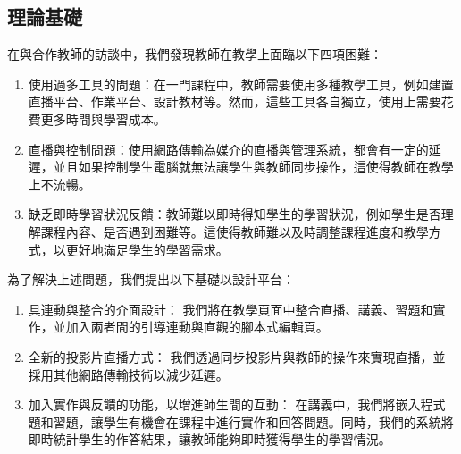 \documentclass[12pt]{article}
\begin{document}
\subsection{理論基礎}
在與合作教師的訪談中，我們發現教師在教學上面臨以下四項困難：
\begin{enumerate}[label=(\arabic*)]
  \item 使用過多工具的問題：在一門課程中，教師需要使用多種教學工具，例如建置直播平台、作業平台、設計教材等。然而，這些工具各自獨立，使用上需要花費更多時間與學習成本。
  \item 直播與控制問題：使用網路傳輸為媒介的直播與管理系統，都會有一定的延遲，並且如果控制學生電腦就無法讓學生與教師同步操作，這使得教師在教學上不流暢。
  \item 缺乏即時學習狀況反饋：教師難以即時得知學生的學習狀況，例如學生是否理解課程內容、是否遇到困難等。這使得教師難以及時調整課程進度和教學方式，以更好地滿足學生的學習需求。
\end{enumerate}
\par 為了解決上述問題，我們提出以下基礎以設計平台：
\begin{enumerate}[label=(\arabic*)]
  \item 具連動與整合的介面設計：
  我們將在教學頁面中整合直播、講義、習題和實作，並加入兩者間的引導連動與直觀的腳本式編輯頁。
  \item 全新的投影片直播方式：
  我們透過同步投影片與教師的操作來實現直播，並採用其他網路傳輸技術以減少延遲。
  \item 加入實作與反饋的功能，以增進師生間的互動：
  在講義中，我們將嵌入程式題和習題，讓學生有機會在課程中進行實作和回答問題。同時，我們的系統將即時統計學生的作答結果，讓教師能夠即時獲得學生的學習情況。
\end{enumerate}
\end{document}
